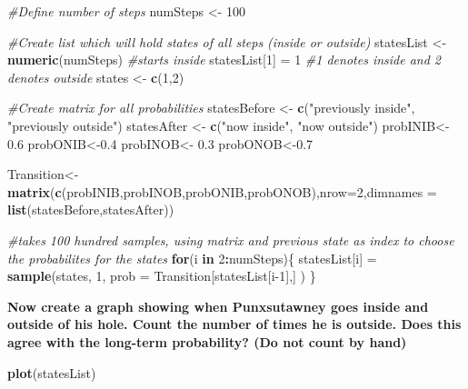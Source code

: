 \documentclass[
]{article}
\newenvironment{Shaded}{\begin{snugshade}}{\end{snugshade}}
\newcommand{\AttributeTok}[1]{\textcolor[rgb]{0.13,0.29,0.53}{#1}}
\newcommand{\CommentTok}[1]{\textcolor[rgb]{0.56,0.35,0.01}{\textit{#1}}}
\newcommand{\ControlFlowTok}[1]{\textcolor[rgb]{0.13,0.29,0.53}{\textbf{#1}}}
\newcommand{\DecValTok}[1]{\textcolor[rgb]{0.00,0.00,0.81}{#1}}
\newcommand{\FloatTok}[1]{\textcolor[rgb]{0.00,0.00,0.81}{#1}}
\newcommand{\FunctionTok}[1]{\textcolor[rgb]{0.13,0.29,0.53}{\textbf{#1}}}
\newcommand{\NormalTok}[1]{#1}
\newcommand{\OtherTok}[1]{\textcolor[rgb]{0.56,0.35,0.01}{#1}}
\newcommand{\SpecialCharTok}[1]{\textcolor[rgb]{0.81,0.36,0.00}{\textbf{#1}}}
\newcommand{\StringTok}[1]{\textcolor[rgb]{0.31,0.60,0.02}{#1}}
\begin{document}
\begin{Shaded}
\begin{Highlighting}[]
\CommentTok{\#Define number of steps}
\NormalTok{numSteps }\OtherTok{\textless{}{-}} \DecValTok{100}

\CommentTok{\#Create list which will hold states of all steps (inside or outside)}
\NormalTok{statesList }\OtherTok{\textless{}{-}} \FunctionTok{numeric}\NormalTok{(numSteps)}
\CommentTok{\#starts inside}
\NormalTok{statesList[}\DecValTok{1}\NormalTok{] }\OtherTok{=} \DecValTok{1}
\CommentTok{\#1 denotes inside and 2 denotes outside}
\NormalTok{states }\OtherTok{\textless{}{-}} \FunctionTok{c}\NormalTok{(}\DecValTok{1}\NormalTok{,}\DecValTok{2}\NormalTok{)}

\CommentTok{\#Create matrix for all probabilities}
\NormalTok{statesBefore }\OtherTok{\textless{}{-}} \FunctionTok{c}\NormalTok{(}\StringTok{"previously inside"}\NormalTok{, }\StringTok{"previously outside"}\NormalTok{)}
\NormalTok{statesAfter }\OtherTok{\textless{}{-}} \FunctionTok{c}\NormalTok{(}\StringTok{"now inside"}\NormalTok{, }\StringTok{"now outside"}\NormalTok{)}
\NormalTok{probINIB}\OtherTok{\textless{}{-}} \FloatTok{0.6}
\NormalTok{probONIB}\OtherTok{\textless{}{-}}\FloatTok{0.4}
\NormalTok{probINOB}\OtherTok{\textless{}{-}} \FloatTok{0.3}
\NormalTok{probONOB}\OtherTok{\textless{}{-}}\FloatTok{0.7}

\NormalTok{Transition}\OtherTok{\textless{}{-}}\FunctionTok{matrix}\NormalTok{(}\FunctionTok{c}\NormalTok{(probINIB,probINOB,probONIB,probONOB),}\AttributeTok{nrow=}\DecValTok{2}\NormalTok{,}\AttributeTok{dimnames =} \FunctionTok{list}\NormalTok{(statesBefore,statesAfter))}

\CommentTok{\#takes 100 hundred samples, using matrix and previous state as index to choose the probabilites for the states}
\ControlFlowTok{for}\NormalTok{(i }\ControlFlowTok{in} \DecValTok{2}\SpecialCharTok{:}\NormalTok{numSteps)\{}
\NormalTok{  statesList[i] }\OtherTok{=} \FunctionTok{sample}\NormalTok{(states, }\DecValTok{1}\NormalTok{, }\AttributeTok{prob =}\NormalTok{ Transition[statesList[i}\DecValTok{{-}1}\NormalTok{],] )}
\NormalTok{\}}
\end{Highlighting}
\end{Shaded}

\textbf{Now create a graph showing when Punxsutawney goes inside and
outside of his hole. Count the number of times he is outside. Does this
agree with the long-term probability? (Do not count by hand)}

\begin{Shaded}
\begin{Highlighting}[]
\FunctionTok{plot}\NormalTok{(statesList)}
\end{Highlighting}
\end{Shaded}
\end{document}
